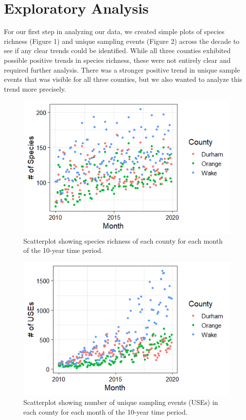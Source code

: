 \documentclass[
  12pt,
]{article}
\begin{document}
\hypertarget{exploratory-analysis}{%
\section{Exploratory Analysis}\label{exploratory-analysis}}

For our first step in analyzing our data, we created simple plots of
species richness (Figure 1) and unique sampling events (Figure 2) across
the decade to see if any clear trends could be identified. While all
three counties exhibited possible positive trends in species richness,
these were not entirely clear and required further analysis. There was a
stronger positive trend in unique sample events that was visible for all
three counties, but we also wanted to analyze this trend more precisely.

\begin{figure}
\centering
\includegraphics{./Output/EDA_SppRichness_Plot.png}
\caption{Scatterplot showing species richness of each county for each
month of the 10-year time period.}
\end{figure}

\begin{figure}
\centering
\includegraphics{./Output/EDA_EventCount_Plot.png}
\caption{Scatterplot showing number of unique sampling events (USEs) in
each county for each month of the 10-year time period.}
\end{figure}
\end{document}
